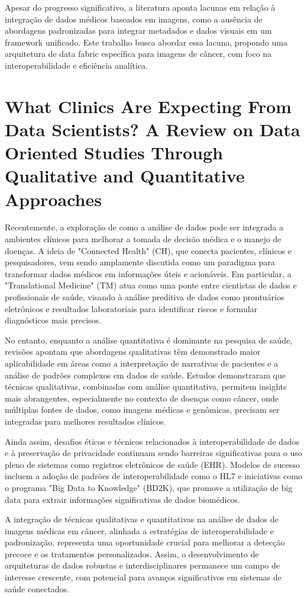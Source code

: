 Apesar do progresso significativo, a literatura aponta lacunas em relação à integração de dados médicos baseados em imagens, como a ausência de 
abordagens padronizadas para integrar metadados e dados visuais em um framework unificado. Este trabalho busca abordar essa lacuna, propondo uma 
arquitetura de data fabric específica para imagens de câncer, com foco na interoperabilidade e eficiência analítica.


\section{What Clinics Are Expecting From Data Scientists? A Review on Data Oriented Studies Through Qualitative and Quantitative Approaches}
 
Recentemente, a exploração de como a análise de dados pode ser integrada a ambientes clínicos para melhorar a tomada de decisão médica e 
o manejo de doenças. A ideia de "Connected Health" (CH), que conecta pacientes, clínicos e pesquisadores, vem sendo amplamente discutida como 
um paradigma para transformar dados médicos em informações úteis e acionáveis. Em particular, a "Translational Medicine" (TM) atua como uma 
ponte entre cientistas de dados e profissionais de saúde, visando à análise preditiva de dados como prontuários eletrônicos e resultados 
laboratoriais para identificar riscos e formular diagnósticos mais precisos. \cite{xu2019clinics}

No entanto, enquanto a análise quantitativa é dominante na pesquisa de saúde, revisões apontam que abordagens qualitativas têm demonstrado 
maior aplicabilidade em áreas como a interpretação de narrativas de pacientes e a análise de padrões complexos em dados de saúde. Estudos 
demonstraram que técnicas qualitativas, combinadas com análise quantitativa, permitem insights mais abrangentes, especialmente no contexto 
de doenças como câncer, onde múltiplas fontes de dados, como imagens médicas e genômicas, precisam ser integradas para melhores resultados 
clínicos. \cite{xu2019clinics}

Ainda assim, desafios éticos e técnicos relacionados à interoperabilidade de dados e à preservação de privacidade continuam sendo barreiras 
significativas para o uso pleno de sistemas como registros eletrônicos de saúde (EHR). Modelos de sucesso incluem a adoção de padrões de 
interoperabilidade como o HL7 e iniciativas como o programa "Big Data to Knowledge" (BD2K), que promove a utilização de big data para extrair 
informações significativas de dados biomédicos.

A integração de técnicas qualitativas e quantitativas na análise de dados de imagens médicas em câncer, alinhada a estratégias de interoperabilidade 
e padronização, representa uma oportunidade crucial para melhorar a detecção precoce e os tratamentos personalizados. Assim, o desenvolvimento de 
arquiteturas de dados robustas e interdisciplinares permanece um campo de interesse crescente, com potencial para avanços significativos em 
sistemas de saúde conectados. \cite{xu2019clinics}